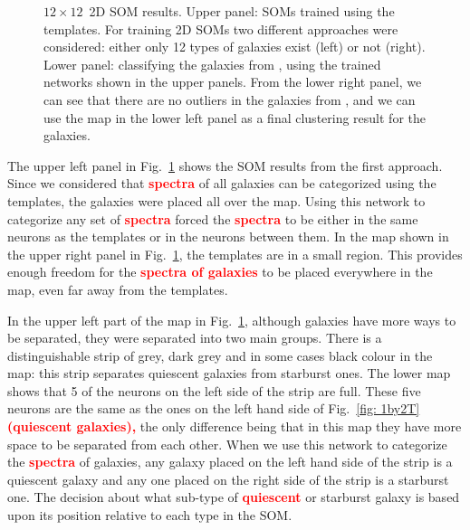 \begin{figure}
        \caption[$12\times12$ two-dimensional self-organizing map results]{$12\times12$~2D SOM results. Upper panel: SOMs trained using the \citet{Kinney96} templates. For training 2D SOMs two different approaches were considered: either only 12 types of galaxies exist (left) or not (right). Lower panel: classifying the galaxies from \citet{Hossein12}, using the trained networks shown in the upper panels. From the lower right panel, we can see that there are no outliers in the galaxies from , and we can use the map in the lower left panel as a final clustering result for the  galaxies.}
        \label{fig: 12by12}
    \end{figure}
    
    The upper left panel in Fig.~\ref{fig: 12by12} shows the SOM results from the first approach. 
    Since we considered that \textbf{\textcolor{red}{spectra}} of all galaxies can be categorized using the  templates, the galaxies were placed all over the map.
    Using this network to categorize any set of \textbf{\textcolor{red}{spectra}} forced the \textbf{\textcolor{red}{spectra}} to be either in the same neurons as the  templates or in the neurons between them.
    In the map shown in the upper right panel in Fig.~\ref{fig: 12by12}, the  templates are in a small region. This provides enough freedom for the \textbf{\textcolor{red}{spectra of galaxies}} to be placed everywhere in the map, even far away from the templates.
    
    
    In the upper left part of the map in Fig.~\ref{fig: 12by12}, although galaxies have more ways to be separated, they were separated into two main groups.
    There is a distinguishable strip of grey, dark grey and in some cases black colour in the map:
    this strip separates quiescent galaxies from starburst ones.
    The lower map shows that 5 of the neurons on the left side of the strip are full. 
    These five neurons are the same as the ones on the left hand side of Fig.~\ref{fig: 1by2T} \textbf{\textcolor{red}{(quiescent galaxies),}}
    the only difference being that in this map they have more space to be separated from each other.
    When we use this network to categorize the \textbf{\textcolor{red}{spectra}} of galaxies, any galaxy placed on the left hand side of the strip is a quiescent galaxy and any one placed on the right side of the strip is a starburst one.
    The decision about what sub-type of \textbf{\textcolor{red}{quiescent}} or starburst galaxy is based upon its position relative to each type in the SOM.
    
